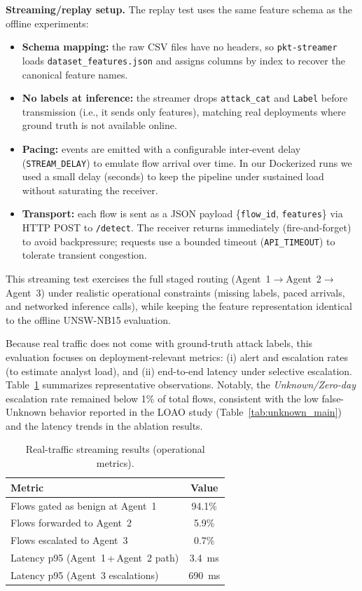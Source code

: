 \documentclass[conference]{IEEEtran}
\begin{document}
\textbf{Streaming/replay setup.} The replay test uses the same feature schema as the offline experiments:
\begin{itemize}
  \item \textbf{Schema mapping:} the raw CSV files have no headers, so \texttt{pkt-streamer} loads \texttt{dataset\_features.json} and assigns columns by index to recover the canonical feature names.
  \item \textbf{No labels at inference:} the streamer drops \texttt{attack\_cat} and \texttt{Label} before transmission (i.e., it sends only features), matching real deployments where ground truth is not available online.
  \item \textbf{Pacing:} events are emitted with a configurable inter-event delay (\texttt{STREAM\_DELAY}) to emulate flow arrival over time. In our Dockerized runs we used a small delay (seconds) to keep the pipeline under sustained load without saturating the receiver.
  \item \textbf{Transport:} each flow is sent as a JSON payload \{\texttt{flow\_id}, \texttt{features}\} via HTTP POST to \texttt{/detect}. The receiver returns immediately (fire-and-forget) to avoid backpressure; requests use a bounded timeout (\texttt{API\_TIMEOUT}) to tolerate transient congestion.
\end{itemize}

This streaming test exercises the full staged routing (Agent~1\(\rightarrow\)Agent~2\(\rightarrow\)Agent~3) under realistic operational constraints (missing labels, paced arrivals, and networked inference calls), while keeping the feature representation identical to the offline UNSW-NB15 evaluation.


Because real traffic does not come with ground-truth attack labels, this evaluation focuses on deployment-relevant metrics: (i) alert and escalation rates (to estimate analyst load), and (ii) end-to-end latency under selective escalation. Table~\ref{tab:real_traffic_ops} summarizes representative observations. Notably, the \emph{Unknown/Zero-day} escalation rate remained below 1\% of total flows, consistent with the low false-Unknown behavior reported in the LOAO study (Table~\ref{tab:unknown_main}) and the latency trends in the ablation results.

\begin{table}[t]
\caption{Real-traffic streaming results (operational metrics).}
\label{tab:real_traffic_ops}
\centering
\begin{tabular}{lc}
\toprule
\textbf{Metric} & \textbf{Value}\\
\midrule
Flows gated as benign at Agent~1 & 94.1\%\\
Flows forwarded to Agent~2 & 5.9\%\\
Flows escalated to Agent~3 & 0.7\%\\
Latency p95 (Agent~1\,+\,Agent~2 path) & \SI{3.4}{\milli\second}\\
Latency p95 (Agent~3 escalations) & \SI{690}{\milli\second}\\
\bottomrule
\end{tabular}
\end{table}
\end{document}
